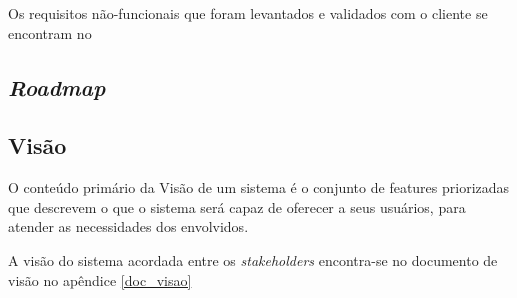 	  Os requisitos não-funcionais que foram levantados e validados com o cliente se encontram no
      
    \subsection{\textit{Roadmap}}
    
      
    
    \subsection{Visão}
    
      O conteúdo primário da Visão de um sistema é o conjunto de features priorizadas que descrevem o que o sistema será capaz de oferecer 
      a seus usuários, para atender as necessidades dos envolvidos. \cite{leffingwell11}
      
      A visão do sistema acordada entre os \textit{stakeholders} encontra-se no documento de visão no apêndice \ref{doc_visao}
      
      \vfill
